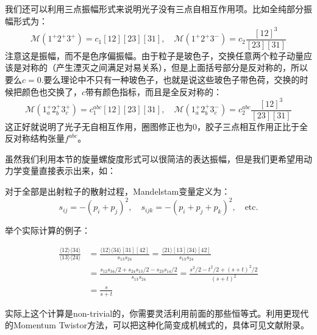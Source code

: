 我们还可以利用三点振幅形式来说明光子没有三点自相互作用项。比如全纯部分振幅形式为：
\begin{equation}
	\mathcal{M}(1^+2^+3^+)=c_1[12][23][31],\quad\mathcal{M}(1^+2^+3^-)=c_2\frac{[12]^3}{[23][31]}
\end{equation}
注意这是振幅，而不是色序偏振幅。由于粒子是玻色子，交换任意两个粒子动量应该是对称的（产生湮灭之间满足对易关系），但是上面括号部分是反对称的，所以要么$c=0$.要么理论中不只有一种玻色子，也就是说这些玻色子带色荷，交换的时候把颜色也交换了，$c$带有颜色指标，而且是全反对称的：
\begin{equation}
	\mathcal{M}(1_a^+2_b^+3_c^+)=c_1^{abc}[12][23][31],\quad\mathcal{M}(1_a^+2_b^+3_c^-)=c_2^{abc}\frac{[12]^3}{[23][31]}
\end{equation}
这正好就说明了光子无自相互作用，圈图修正也为0，胶子三点相互作用正比于全反对称结构张量$f^{abc}$。

虽然我们利用本节的旋量螺旋度形式可以很简洁的表达振幅，但是我们更希望用动力学变量直接表示出来，如：
\begin{definition}
	对于全部是出射粒子的散射过程，Mandelstam变量定义为：
	\begin{equation}
		s_{ij}=-(p_i+p_j)^2,\quad s_{ijk}=-(p_i+p_j+p_k)^2,\quad\text{etc}.
	\end{equation}
\end{definition}
举个实际计算的例子：
\begin{example}
	\begin{equation}
		\begin{aligned}
		\frac{\langle12\rangle\langle34\rangle}{\langle13\rangle\langle24\rangle}& =\frac{\langle12\rangle\langle34\rangle[31][42]}{s_{13}s_{24}}=\frac{\langle21\rangle[13]\langle34\rangle[42]}{s_{13}s_{24}}  \\
		&=\frac{s_{12}s_{34}/2+s_{24}s_{13}/2-s_{23}s_{14}/2}{s_{13}s_{24}}=\frac{s^2/2-t^2/2+(s+t)^2/2}{(s+t)^2} \\
		&=\frac s{s+t}
	\end{aligned}
	\end{equation}
\end{example}
实际上这个计算是non-trivial的，你需要灵活利用前面的那些恒等式。利用更现代的Momentum Twistor方法，可以把这种化简变成机械式的，具体可见文献\cite{Badger:2013gxa}附录。
